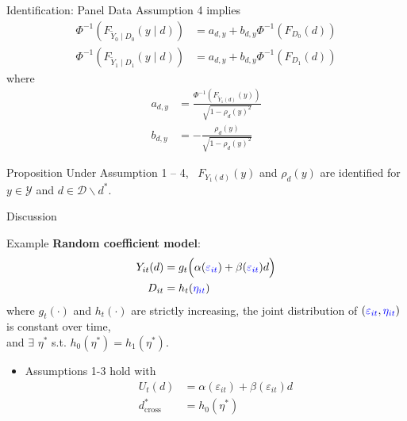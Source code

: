 \documentclass[aspectratio=1610, 9pt]{beamer}
\begin{document}
\begin{frame}{Identification: Panel Data}
Assumption 4 implies
\begin{align*}
    \Phi^{-1}\left(F_{\tilde{Y}_{0}\mid D_{0}}(y\mid d)\right)	&=a_{d,y}+b_{d,y}\Phi^{-1}\left(F_{D_{0}}(d)\right)\\
\Phi^{-1}\left(F_{\tilde{Y}_{1}\mid D_{1}}(y\mid d)\right)	&=a_{d,y}+b_{d,y}\Phi^{-1}\left(F_{D_{1}}(d)\right)
\end{align*}
where 
\begin{align*}
    a_{d,y}	&=\frac{\Phi^{-1}\left(F_{\tilde{Y}_1(d)}(y)\right)}{\sqrt{1-\rho_{d}(y)^{2}}}\\
b_{d,y}	&=-\frac{\rho_{d}(y)}{\sqrt{1-\rho_{d}(y)^{2}}}
\end{align*}

\begin{block}{Proposition}
    Under Assumption 1 -- 4, \ $F_{Y_{1}(d)}(y)$ and $\rho_{d}(y)$ are identified for $y\in\mathcal{Y}$ and $d\in\mathcal{D} \backslash d^*$.
\end{block} 
    
\end{frame}



\begin{frame}{Discussion}
    
\end{frame}

\begin{frame}{Example}
     \textbf{Random coefficient model}:
 \begin{align*}
     Y_{it}(d) & =g_t\Big(\alpha(\textcolor{blue}{\varepsilon_{it}}) +\beta(\textcolor{blue}{\varepsilon_{it}}) d\Big)\\
D_{it}&=h_{t}(\textcolor{blue}{\eta_{it}})
 \end{align*}
where $g_t(\cdot) $ and $h_t(\cdot)$ are strictly increasing, the joint distribution of $(\textcolor{blue}{\varepsilon_{it}},\textcolor{blue}{\eta_{it}})$ is constant over time, \\and $\exists $ $\eta^*$ s.t. $h_0(\eta^*)=h_1(\eta^*)$.
\vspace{0.3cm}
\begin{itemize}
    \item Assumptions 1-3 hold with
    \begin{align*}
        U_t(d)&=\alpha(\varepsilon_{it}) +\beta(\varepsilon_{it}) d\\
        d^*_{\text{cross}}& =h_0( \eta^*)
    \end{align*}
\end{itemize}
\end{frame}
\end{document}
